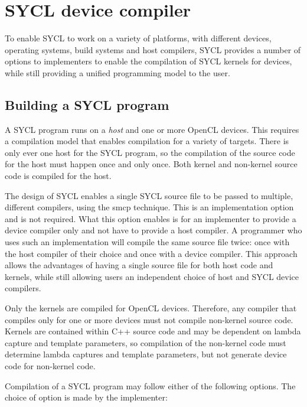 \section{SYCL device compiler}

To enable SYCL to work on a variety of platforms, with different devices,
operating systems, build systems and host compilers, SYCL provides a number of
options to implementers to enable the compilation of SYCL kernels for devices,
while still providing a unified programming model to the user.

\subsection{Building a SYCL program}

A SYCL program runs on a \emph{host} and one or more OpenCL devices. This
requires a compilation model that enables compilation for a variety of targets.
There is only ever one host for the SYCL program, so the compilation of the
source code for the host must happen once and only once. Both kernel and
non-kernel source code is compiled for the host.

The design of SYCL enables a single SYCL source file to be passed to multiple,
different compilers, using the \gls{smcp}
technique. This is an implementation option and is not required.
What this option enables is for an implementer to provide a device compiler only
and not have to provide a host compiler. A programmer who uses such an
implementation will compile the same source file twice: once with the host
compiler of their choice and once with a device compiler. This approach allows
the advantages of having a single source file for both host code and kernels,
while still allowing users an independent choice of host and SYCL device
compilers. 

Only the \glspl{kernel} are compiled for OpenCL devices. Therefore, any compiler that
compiles only for one or more devices must not compile non-kernel source code.
Kernels are contained within C++ source code and may be dependent on lambda
capture and template parameters, so compilation of the non-kernel code must
determine lambda captures and template parameters, but not generate device code
for non-kernel code.

Compilation of a SYCL program may follow either of the following options.
The choice of option is made by the implementer:

